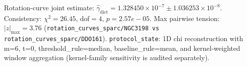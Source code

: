 Rotation-curve joint estimate: $\widehat\gamma_{\mathrm{dict}}=1.328450\times 10^{-7} \pm 1.036253\times 10^{-8}$. Consistency: $\chi^2=26.45$, $\mathrm{dof}=4$, $p=2.57e-05$. Max pairwise tension: $|z|_{\max}=3.76$ (\texttt{rotation\_curves\_sparc/NGC3198 vs rotation\_curves\_sparc/DDO161}). \texttt{protocol\_state}: 1D chi reconstruction with m=6, t=0, threshold\_rule=median, baseline\_rule=mean, and kernel-weighted window aggregation (kernel-family sensitivity is audited separately).